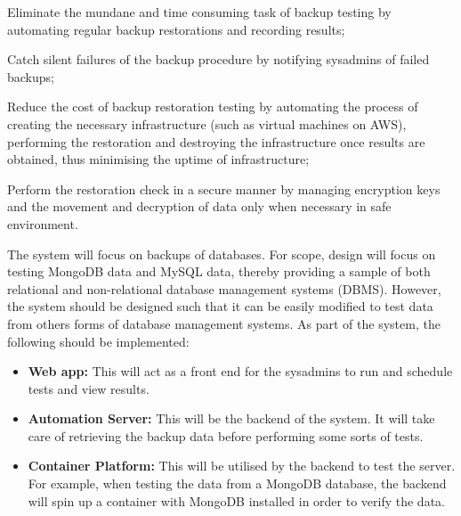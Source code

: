 \begin{AO}
	\item \label{ao1} Eliminate the mundane and time consuming task of backup testing by automating regular backup restorations and recording results;
	\item \label{ao2} Catch silent failures of the backup procedure by notifying sysadmins of failed backups;
	\item \label{ao3} Reduce the cost of backup restoration testing by automating the process of creating the necessary infrastructure (such as virtual machines on AWS), performing the restoration and destroying the infrastructure once results are obtained, thus minimising the uptime of infrastructure;
	\item \label{ao4} Perform the restoration check in a secure manner by managing encryption keys and the movement and decryption of data only when necessary in safe environment.
\end{AO}

The system will focus on backups of databases. For scope, design will focus on testing MongoDB data and MySQL data, thereby providing a sample of both relational and non-relational database management systems (DBMS). However, the system should be designed such that it can be easily modified to test data from others forms of database management systems. As part of the system, the following should be implemented:

\begin{itemize}
	\item \textbf{Web app:} This will act as a front end for the sysadmins to run and schedule tests and view results.
	\item \textbf{Automation Server:} This will be the backend of the system. It will take care of retrieving the backup data before performing some sorts of tests.
	\item \textbf{Container Platform:} This will be utilised by the backend to test the server. For example, when testing the data from a MongoDB database, the backend will spin up a container with MongoDB installed in order to verify the data. 
\end{itemize}
